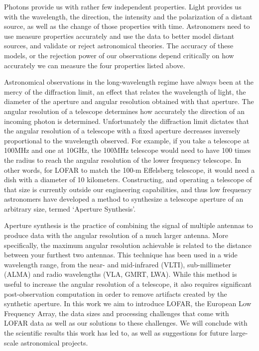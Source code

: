 Photons provide us with rather few independent properties. Light provides us with the wavelength, the direction, the intensity and the polarization of a distant source, as well as the change of those properties with time. Astronomers need to use measure properties accurately and use the data to better model distant sources, and validate or reject astronomical theories. The accuracy of these models, or the rejection power of our observations depend critically on how accurately we can measure the four properties listed above. 

Astronomical observations in the long-wavelength regime have always been at the mercy of the diffraction limit, an effect that relates the wavelength of light, the diameter of the aperture and angular resolution obtained with that aperture. The angular resolution of a telescope determines how accurately the direction of an incoming photon is determined. Unfortunately the diffraction limit dictates that the angular resolution of a telescope with a fixed aperture decreases inversely proportional to the wavelength observed. For example, if you take a telescope at 100MHz and one at 10GHz, the 100MHz telescope would need to have 100 times the radius to reach the angular resolution of the lower frequency telescope. In other words, for LOFAR to match the 100-m Effelsberg telescope, it would need a dish with a diameter of 10 kilometers. Constructing, and operating a telescope of that size is currently outside our engineering capabilities, and thus low frequency astronomers have developed a method to synthesize a telescope aperture of an arbitrary size, termed `Aperture Synthesis'. 

Aperture synthesis is the practice of combining the signal of multiple antennas to produce data with the angular resolution of a much larger antenna. More specifically, the maximum angular resolution achievable is related to the distance between your furthest two antennas. This technique has been used in a wide wavelength range, from the near- and mid-infrared (VLTI), sub-millimeter (ALMA) and radio wavelengths (VLA, GMRT, LWA). While this method is useful to increase the angular resolution of a telescope, it also requires significant post-observation computation in order to remove artifacts created by the synthetic aperture. In this work we aim to introduce LOFAR, the European Low Frequency Array, the data sizes and processing challenges that come with LOFAR data as well as our solutions to these challenges. We will conclude with the scientific results this work has led to, as well as suggestions for future large-scale astronomical projects.

